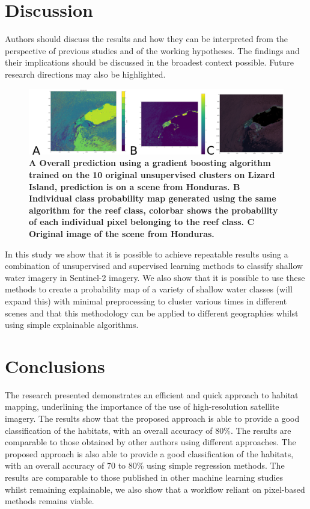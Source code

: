 \documentclass[journal,article,submit,pdftex,moreauthors]{Definitions/mdpi}
\begin{document}
\section{Discussion}
Authors should discuss the results and how they can be interpreted from the perspective of previous studies and of the working hypotheses. The findings and their implications should be discussed in the broadest context possible. Future research directions may also be highlighted.
\begin{figure}
	\centering
	\includegraphics[width=0.7\linewidth]{Images/Honduras_Prediction.png}
	\caption{\bf{A} Overall prediction using a gradient boosting algorithm trained on the 10 original unsupervised clusters on Lizard Island, prediction is on a scene from Honduras. \bf{B} Individual class probability map generated using the same algorithm for the reef class, colorbar shows the probability of each individual pixel belonging to the reef class.
	\bf{C} Original image of the scene from Honduras.}
	\label{fig:UnsupervisedWorkflow}
\end{figure}
In this study we show that it is possible to achieve repeatable results using a combination of unsupervised and supervised learning methods to classify shallow water imagery in Sentinel-2 imagery. 
We also show that it is possible to use these methods to create a probability map of a variety of shallow water classes (will expand this) with minimal preprocessing to cluster various times in different scenes and that this methodology can be applied to different geographies whilst 
using simple explainable algorithms. 

\section{Conclusions}

The research presented demonstrates an efficient and quick approach to habitat mapping, underlining the importance of the use of high-resolution satellite imagery. The results show that the proposed approach is able to provide a good classification of the habitats, with an overall accuracy of 80\%. The results are comparable to those obtained by other authors using different approaches. The proposed approach is also able to provide a good classification of the habitats, with an overall accuracy of 70 to 80\% using simple regression methods. 
The results are comparable to those published in other machine learning studies whilst remaining explainable, we also show that a workflow reliant on pixel-based methods remains viable.
\end{document}

